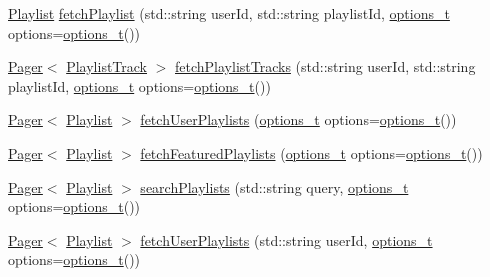 \begin{DoxyCompactItemize}
\item 
\mbox{\hyperlink{class_playlist}{Playlist}} \mbox{\hyperlink{class_spotify_a_p_i_a1d4dc0e62ce453938965fcbd4d6ddf8c}{fetch\+Playlist}} (std\+::string user\+Id, std\+::string playlist\+Id, \mbox{\hyperlink{_spotify_a_p_i_8h_a0ff5cac1a4007bb330b7d9939650c283}{options\+\_\+t}} options=\mbox{\hyperlink{_spotify_a_p_i_8h_a0ff5cac1a4007bb330b7d9939650c283}{options\+\_\+t}}())
\item 
\mbox{\hyperlink{class_pager}{Pager}}$<$ \mbox{\hyperlink{class_playlist_track}{Playlist\+Track}} $>$ \mbox{\hyperlink{class_spotify_a_p_i_a0093e71746beb4cae5cafec78db45267}{fetch\+Playlist\+Tracks}} (std\+::string user\+Id, std\+::string playlist\+Id, \mbox{\hyperlink{_spotify_a_p_i_8h_a0ff5cac1a4007bb330b7d9939650c283}{options\+\_\+t}} options=\mbox{\hyperlink{_spotify_a_p_i_8h_a0ff5cac1a4007bb330b7d9939650c283}{options\+\_\+t}}())
\item 
\mbox{\hyperlink{class_pager}{Pager}}$<$ \mbox{\hyperlink{class_playlist}{Playlist}} $>$ \mbox{\hyperlink{class_spotify_a_p_i_a79f8d10db209ef00b17c0e7e0df750e8}{fetch\+User\+Playlists}} (\mbox{\hyperlink{_spotify_a_p_i_8h_a0ff5cac1a4007bb330b7d9939650c283}{options\+\_\+t}} options=\mbox{\hyperlink{_spotify_a_p_i_8h_a0ff5cac1a4007bb330b7d9939650c283}{options\+\_\+t}}())
\item 
\mbox{\hyperlink{class_pager}{Pager}}$<$ \mbox{\hyperlink{class_playlist}{Playlist}} $>$ \mbox{\hyperlink{class_spotify_a_p_i_a74c7fb4877d5e5793110dca0e2fa9606}{fetch\+Featured\+Playlists}} (\mbox{\hyperlink{_spotify_a_p_i_8h_a0ff5cac1a4007bb330b7d9939650c283}{options\+\_\+t}} options=\mbox{\hyperlink{_spotify_a_p_i_8h_a0ff5cac1a4007bb330b7d9939650c283}{options\+\_\+t}}())
\item 
\mbox{\hyperlink{class_pager}{Pager}}$<$ \mbox{\hyperlink{class_playlist}{Playlist}} $>$ \mbox{\hyperlink{class_spotify_a_p_i_ab2f004b11a4179e588137fc3187f569c}{search\+Playlists}} (std\+::string query, \mbox{\hyperlink{_spotify_a_p_i_8h_a0ff5cac1a4007bb330b7d9939650c283}{options\+\_\+t}} options=\mbox{\hyperlink{_spotify_a_p_i_8h_a0ff5cac1a4007bb330b7d9939650c283}{options\+\_\+t}}())
\item 
\mbox{\hyperlink{class_pager}{Pager}}$<$ \mbox{\hyperlink{class_playlist}{Playlist}} $>$ \mbox{\hyperlink{class_spotify_a_p_i_a45c23825a41c89ff92fa1939fc0bfd76}{fetch\+User\+Playlists}} (std\+::string user\+Id, \mbox{\hyperlink{_spotify_a_p_i_8h_a0ff5cac1a4007bb330b7d9939650c283}{options\+\_\+t}} options=\mbox{\hyperlink{_spotify_a_p_i_8h_a0ff5cac1a4007bb330b7d9939650c283}{options\+\_\+t}}())

\end{DoxyCompactItemize}
